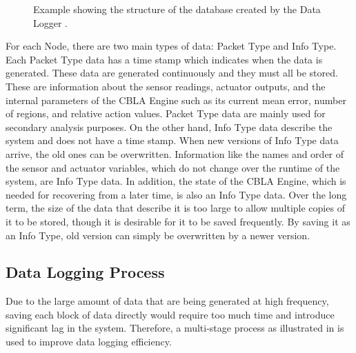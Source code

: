 \begin{figure}
	\caption[Structure of the database created by Data Logger]{Example showing the structure of the database created by the Data Logger .}
	\label{fig:data_structure}
\end{figure}

For each Node, there are two main types of data: Packet Type and Info Type. Each Packet Type data has a time stamp which indicates when the data is generated. These data are generated continuously and they must all be stored. These are information about the sensor readings, actuator outputs, and the internal parameters of the CBLA Engine such as its current mean error, number of regions, and relative action values. Packet Type data are mainly used for secondary analysis purposes. On the other hand, Info Type data describe the system and does not have a time stamp. When new versions of Info Type data arrive, the old ones can be overwritten. Information like the names and order of the sensor and actuator variables, which do not change over the runtime of the system, are Info Type data. In addition, the state of the CBLA Engine, which is needed for recovering from a later time, is also an Info Type data. Over the long term, the size of the data that describe it is too large to allow multiple copies of it to be stored, though it is desirable for it to be saved frequently. By saving it as an Info Type, old version can simply be overwritten by a newer version.

\subsection{Data Logging Process}

Due to the large amount of data that are being generated at high frequency, saving each block of data directly would require too much time and introduce significant lag in the system. Therefore, a multi-stage process as illustrated in  is used to improve data logging efficiency.


